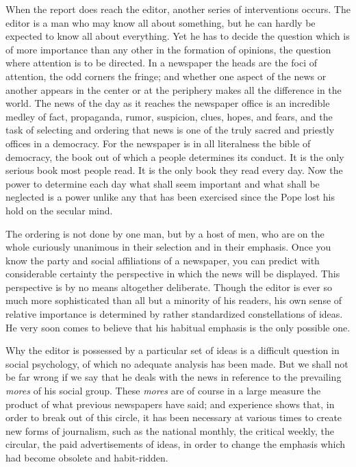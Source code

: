 \documentclass[openany,nobib,nohyper]{tufte-book}
\begin{document}
When the report does reach the editor, another series of interventions
occurs. The editor is a man who may know all about something, but he can
hardly be expected to know all about everything. Yet he has to decide
the question which is of more importance than any other in the formation
of opinions, the question where attention is to be directed. In a
newspaper the heads are the foci of attention, the odd corners the
fringe; and whether one aspect of the news or another appears in the
center or at the periphery makes all the difference in the world. The
news of the day as it reaches the newspaper office is an incredible
medley of fact, propaganda, rumor, suspicion, clues, hopes, and fears,
and the task of selecting and ordering that news is one of the truly
sacred and priestly offices in a democracy. For the newspaper is in all
literalness the bible of democracy, the book out of which a people
determines its conduct. It is the only serious book most people read. It
is the only book they read every day. Now the power to determine each
day what shall seem important and what shall be neglected is a power
unlike any that has been exercised since the Pope lost his hold on the
secular mind.

The ordering is not done by one man, but by a host of men, who are on
the whole curiously unanimous in their selection and in their emphasis.
Once you know the party and social affiliations of a newspaper, you can
predict with considerable certainty the perspective in which the news
will be displayed. This perspective is by no means altogether
deliberate. Though the editor is ever so much more sophisticated than
all but a minority of his readers, his own sense of relative importance
is determined by rather standardized constellations of ideas. He very
soon comes to believe that his habitual emphasis is the only possible
one.

Why the editor is possessed by a particular set of ideas is a difficult
question in social psychology, of which no adequate analysis has been
made. But we shall not be far wrong if we say that he deals with the
news in reference to the prevailing \emph{mores} of his social group.
These \emph{mores} are of course in a large measure the product of what
previous newspapers have said; and experience shows that, in order to
break out of this circle, it has been necessary at various times to
create new forms of journalism, such as the national monthly, the
critical weekly, the circular, the paid advertisements of ideas, in
order to change the emphasis which had become obsolete and habit-ridden.
\end{document}
